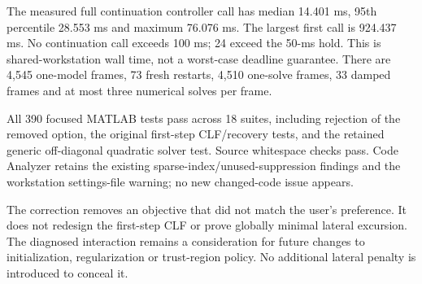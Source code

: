 \documentclass[10pt]{article}
\begin{document}
The measured full continuation controller call has median 14.401 ms,
95th percentile 28.553 ms and maximum 76.076 ms. The largest first call is
924.437 ms. No continuation call exceeds 100 ms; 24 exceed the 50-ms hold.
This is shared-workstation wall time, not a worst-case deadline guarantee.
There are 4,545 one-model frames, 73 fresh restarts, 4,510 one-solve frames,
33 damped frames and at most three numerical solves per frame.

All 390 focused MATLAB tests pass across 18 suites, including rejection of
the removed option, the original first-step CLF/recovery tests, and the retained
generic off-diagonal quadratic solver test. Source whitespace checks pass.
Code Analyzer retains the existing sparse-index/unused-suppression findings
and the workstation settings-file warning; no new changed-code issue appears.

The correction removes an objective that did not match the user's preference.
It does not redesign the first-step CLF or prove globally minimal lateral
excursion. The diagnosed interaction remains a consideration for future
changes to initialization, regularization or trust-region policy. No additional
lateral penalty is introduced to conceal it.
\end{document}
